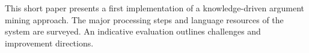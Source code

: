 This short paper presents a first implementation of a knowledge-driven argument mining approach. The major processing steps and language resources of the system are surveyed. An indicative evaluation outlines challenges and improvement directions.
